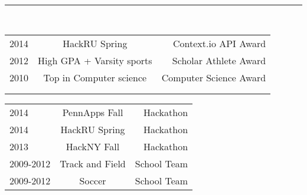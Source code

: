 \documentclass[letterpaper]{deedy-resume} %
\begin{document}
\sectionspace

\hfill
{}
\vspace{1 mm}
\normalfont
\hrule height .1pt \leavevmode \\
\vspace{2 mm}
\normalfont
\fontsize{10pt}{12pt}
\selectfont
\begin{minipage}[t]{0.66\textwidth}
\begin{tabular}{lcr}
2014 & HackRU Spring & Context.io API Award \\
2012 & High GPA + Varsity sports & Scholar Athlete Award \\
2010 & Top in Computer science & Computer Science Award\\
	& &\\
	& &\\

\end{tabular}
\end{minipage}
\begin{minipage}[t]{0.33\textwidth}
\hfill	
\begin{tabular}{lcr}
2014 & PennApps Fall & Hackathon\\ 
2014 & HackRU Spring & Hackathon\\
2013 & HackNY Fall   & Hackathon\\
2009-2012 & Track and Field & School Team\\  	
2009-2012 & Soccer & School Team\\
\end{tabular}    
\end{minipage}




\sectionspace %



\sectionspace %




\end{document}
